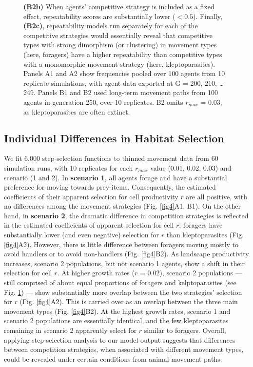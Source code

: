 \begin{figure}[h!]
{        \textbf{(B2b)} When agents' competitive strategy is included as a fixed effect, repeatability scores are substantially lower ($< 0.5$).
        Finally, \textbf{(B2c)}, repeatability models run separately for each of the competitive strategies would essentially reveal that competitive types with strong dimorphism (or clustering) in movement types (here, foragers) have a higher repeatability than competitive types with a monomorphic movement strategy (here, kleptoparasites).
        Panels A1 and A2 show frequencies pooled over 100 agents from 10 replicate simulations, with agent data exported at G = 200, 210, \ldots 249.
        Panels B1 and B2 used long-term movement paths from 100 agents in generation 250, over 10 replicates. B2 omits $r_{max}$ = 0.03, as kleptoparasites are often extinct.
    }
    \label{fig3}
\end{figure}

\subsection*{Individual Differences in Habitat Selection}

We fit 6,000 step-selection functions to thinned movement data from 60 simulation runs, with 10 replicates for each $r_{max}$ value (0.01, 0.02, 0.03) and scenario (1 and 2).
In \textbf{scenario 1}, all agents forage and have a substantial preference for moving towards prey-items.
Consequently, the estimated coefficients of their apparent selection for cell productivity $r$ are all positive, with no differences among the movement strategies (Fig. \ref{fig4}A1, B1).
On the other hand, in \textbf{scenario 2}, the dramatic difference in competition strategies is reflected in the estimated coefficients of apparent selection for cell $r$; foragers have substantially lower (and even negative) selection for $r$ than kleptoparasites (Fig. \ref{fig4}A2).
However, there is little difference between foragers moving mostly to avoid handlers or to avoid non-handlers (Fig. \ref{fig4}B2).
As landscape productivity increases, scenario 2 populations, but not scenario 1 agents, show a shift in their selection for cell $r$.
At higher growth rates ($r$ = 0.02), scenario 2 populations --- still comprised of about equal proportions of foragers and kelptoparasites (see Fig. \ref{fig3}) --- show substantially more overlap between the two strategies' selection for $r$ (Fig. \ref{fig4}A2).
This is carried over as an overlap between the three main movement types (Fig. \ref{fig4}B2).
At the highest growth rates, scenario 1 and scenario 2 populations are essentially identical, and the few kleptoparasites remaining in scenario 2 apparently select for $r$ similar to foragers.
Overall, applying step-selection analysis to our model output suggests that differences between competition strategies, when associated with different movement types, could be revealed under certain conditions from animal movement paths.

